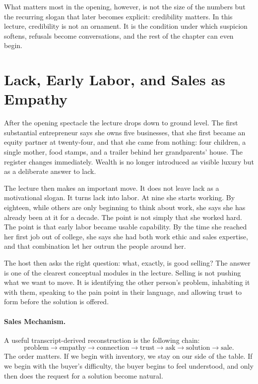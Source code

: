 What matters most in the opening, however, is not the size of the numbers but the recurring slogan that later becomes explicit: credibility matters. In this lecture, credibility is not an ornament. It is the condition under which suspicion softens, refusals become conversations, and the rest of the chapter can even begin.

\section{Lack, Early Labor, and Sales as Empathy}

After the opening spectacle the lecture drops down to ground level. The first substantial entrepreneur says she owns five businesses, that she first became an equity partner at twenty-four, and that she came from nothing: four children, a single mother, food stamps, and a trailer behind her grandparents' house. The register changes immediately. Wealth is no longer introduced as visible luxury but as a deliberate answer to lack.

The lecture then makes an important move. It does not leave lack as a motivational slogan. It turns lack into labor. At nine she starts working. By eighteen, while others are only beginning to think about work, she says she has already been at it for a decade. The point is not simply that she worked hard. The point is that early labor became usable capability. By the time she reached her first job out of college, she says she had both work ethic and sales expertise, and that combination let her outrun the people around her.

The host then asks the right question: what, exactly, is good selling? The answer is one of the clearest conceptual modules in the lecture. Selling is not pushing what we want to move. It is identifying the other person's problem, inhabiting it with them, speaking to the pain point in their language, and allowing trust to form before the solution is offered.

\paragraph{Sales Mechanism.}
A useful transcript-derived reconstruction is the following chain:
\begin{equation}
\text{problem} \to \text{empathy} \to \text{connection} \to \text{trust} \to \text{ask} \to \text{solution} \to \text{sale}.
\end{equation}
The order matters. If we begin with inventory, we stay on our side of the table. If we begin with the buyer's difficulty, the buyer begins to feel understood, and only then does the request for a solution become natural.

